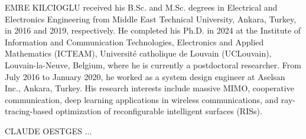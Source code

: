 \documentclass{IEEEoj}
\begin{document}
\begin{IEEEbiography}{EMRE KILCIOGLU } received his B.Sc. and M.Sc. degrees in Electrical and Electronics Engineering from Middle East Technical University, Ankara, Turkey, in 2016 and 2019, respectively. He completed his Ph.D. in 2024 at the Institute of Information and Communication Technologies, Electronics and Applied Mathematics (ICTEAM), Université catholique de Louvain (UCLouvain), Louvain-la-Neuve, Belgium, where he is currently a postdoctoral researcher. From July 2016 to January 2020, he worked as a system design engineer at Aselsan Inc., Ankara, Turkey. His research interests include massive MIMO, cooperative communication, deep learning applications in wireless communications, and ray-tracing-based optimization of reconfigurable intelligent surfaces (RISs).
\end{IEEEbiography}

\begin{IEEEbiography}{CLAUDE OESTGES } ...
\end{IEEEbiography}
\end{document}
